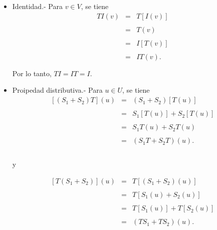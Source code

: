 \begin{enumerate}[\bfseries 1.]
\begin{itemize}
		\item Identidad.- Para $v\in V$, se tiene
		    $$
		    \begin{array}{rcl}
			TI(v) &=& T\left[I(v)\right]\\\\
					     &=& T(v)\\\\
					     &=& I\left[T(v)\right]\\\\
					     &=& IT(v).\\\\
		    \end{array}
		    $$
		    Por lo tanto, $TI=IT=I$.\\

		\item Proipedad distributiva.- Para $u\in U$, se tiene
		    $$
		    \begin{array}{rcl}
			\left[(S_1+S_2)T\right](u) &=& (S_1+S_2)\left[T(u)\right]\\\\
						   &=& S_1\left[T(u)\right]+S_2\left[T(u)\right]\\\\
						   &=& S_1T(u)+S_2T(u)\\\\
						   &=& (S_1T+S_2T)(u).\\\\
		    \end{array}
		    $$

		    \begin{center}
			y
		    \end{center}

		    $$
		    \begin{array}{rcl}
			\left[T(S_1+S_2)\right](u) &=& T\left[(S_1+S_2)(u)\right]\\\\
						   &=& T\left[S_1(u)+S_2(u)\right]\\\\
						   &=& T\left[S_1(u)\right]+T\left[S_2(u)\right]\\\\
						   &=& (TS_1+TS_2)(u).\\\\
		    \end{array}
		    $$
		    \vspace{.5cm}


	    \end{itemize}


\end{enumerate}
